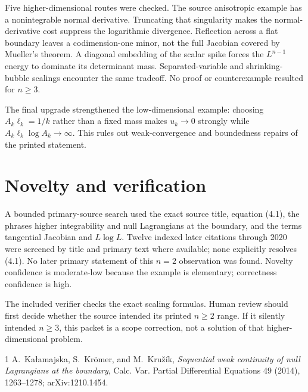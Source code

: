 \documentclass[11pt,a4paper]{article}
\begin{document}
Five higher-dimensional routes were checked.  The source anisotropic example
has a nonintegrable normal derivative.  Truncating that singularity makes the
normal-derivative cost suppress the logarithmic divergence.  Reflection across
a flat boundary leaves a codimension-one minor, not the full Jacobian covered
by Mueller's theorem.  A diagonal embedding of the scalar spike forces the
$L^{n-1}$ energy to dominate its determinant mass.  Separated-variable and
shrinking-bubble scalings encounter the same tradeoff.  No proof or
counterexample resulted for $n\geq3$.

The final upgrade strengthened the low-dimensional example: choosing
$A_k\ell_k=1/k$ rather than a fixed mass makes $u_k\to0$ strongly while
$A_k\ell_k\log A_k\to\infty$.  This rules out weak-convergence and boundedness
repairs of the printed statement.

\section{Novelty and verification}
A bounded primary-source search used the exact source title, equation (4.1),
the phrases higher integrability and null Lagrangians at the boundary,
and the terms tangential Jacobian and $L\log L$.  Twelve indexed later
citations through 2020 were screened by title and primary text where available;
none explicitly resolves (4.1).  No later primary statement of this $n=2$
observation was found.  Novelty confidence is moderate-low because the example
is elementary; correctness confidence is high.

The included verifier checks the exact scaling formulas.  Human review should
first decide whether the source intended its printed $n\geq2$ range.  If it
silently intended $n\geq3$, this packet is a scope correction, not a solution
of that higher-dimensional problem.

\begin{thebibliography}{1}
A.~Ka\l amajska, S.~Kr\"omer, and M.~Kružík,
\emph{Sequential weak continuity of null Lagrangians at the boundary},
Calc. Var. Partial Differential Equations 49 (2014), 1263--1278;
arXiv:1210.1454.
\end{thebibliography}
\end{document}

